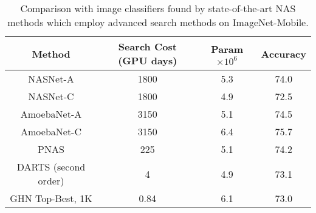 \begin{table}[t]
\vspace{-0.5cm}
\caption{Comparison with image classifiers found by state-of-the-art NAS methods which employ advanced search methods on ImageNet-Mobile.}
\vspace{-0.2cm}
\label{table:Results3}
\footnotesize
\begin{center}
\begin{tabular}{ c c c c } 
Method & Search Cost (GPU days) & Param $\times 10^6$ & Accuracy   \\ 
\hline
NASNet-A  \citep{zoph2017learning} & 1800 & 5.3 & 74.0 \\
NASNet-C  \citep{zoph2017learning} & 1800 & 4.9 & 72.5 \\
AmoebaNet-A \citep{real2018regularized} & 3150 & 5.1 & 74.5  \\
AmoebaNet-C \citep{real2018regularized} & 3150 & 6.4 & 75.7  \\
PNAS \citep{liu2017progressive} & 225 & 	5.1 &  74.2\\
DARTS (second order) \citep{liu2018darts} & 4  & 4.9 & 73.1\\
\hline
\hline
GHN Top-Best, 1K & 0.84  & 6.1  & 73.0  \\
\end{tabular}
\end{center}
\vspace{-0.5cm}
\end{table}